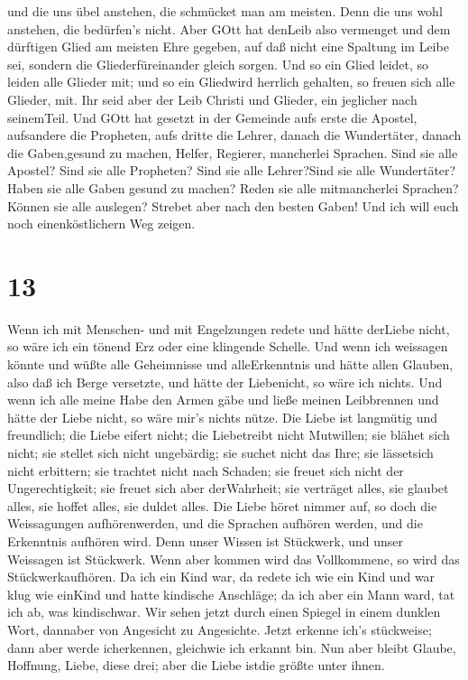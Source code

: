 und die uns übel anstehen, die schmücket man am meisten. 
Denn die uns wohl anstehen, die bedürfen's nicht. Aber GOtt hat denLeib
also vermenget und dem dürftigen Glied am meisten Ehre gegeben,
 auf daß nicht eine Spaltung im Leibe sei, sondern die
Gliederfüreinander gleich sorgen.  Und so ein Glied leidet,
so leiden alle Glieder mit; und so ein Gliedwird herrlich gehalten, so
freuen sich alle Glieder, mit.  Ihr seid aber der Leib
Christi und Glieder, ein jeglicher nach seinemTeil.  Und
GOtt hat gesetzt in der Gemeinde aufs erste die Apostel, aufsandere die
Propheten, aufs dritte die Lehrer, danach die Wundertäter, danach die
Gaben,gesund zu machen, Helfer, Regierer, mancherlei Sprachen.
 Sind sie alle Apostel? Sind sie alle Propheten? Sind sie
alle Lehrer?Sind sie alle Wundertäter?  Haben sie alle
Gaben gesund zu machen? Reden sie alle mitmancherlei Sprachen? Können
sie alle auslegen?  Strebet aber nach den besten Gaben! Und
ich will euch noch einenköstlichern Weg zeigen.

\hypertarget{section-12}{%
\section{13}\label{section-12}}

 Wenn ich mit Menschen- und mit Engelzungen redete und hätte
derLiebe nicht, so wäre ich ein tönend Erz oder eine klingende Schelle.
 Und wenn ich weissagen könnte und wüßte alle Geheimnisse
und alleErkenntnis und hätte allen Glauben, also daß ich Berge
versetzte, und hätte der Liebenicht, so wäre ich nichts. 
Und wenn ich alle meine Habe den Armen gäbe und ließe meinen Leibbrennen
und hätte der Liebe nicht, so wäre mir's nichts nütze.  Die
Liebe ist langmütig und freundlich; die Liebe eifert nicht; die
Liebetreibt nicht Mutwillen; sie blähet sich nicht;  sie
stellet sich nicht ungebärdig; sie suchet nicht das Ihre; sie lässetsich
nicht erbittern; sie trachtet nicht nach Schaden;  sie
freuet sich nicht der Ungerechtigkeit; sie freuet sich aber derWahrheit;
 sie verträget alles, sie glaubet alles, sie hoffet alles,
sie duldet alles.  Die Liebe höret nimmer auf, so doch die
Weissagungen aufhörenwerden, und die Sprachen aufhören werden, und die
Erkenntnis aufhören wird.  Denn unser Wissen ist Stückwerk,
und unser Weissagen ist Stückwerk.  Wenn aber kommen wird
das Vollkommene, so wird das Stückwerkaufhören.  Da ich ein
Kind war, da redete ich wie ein Kind und war klug wie einKind und hatte
kindische Anschläge; da ich aber ein Mann ward, tat ich ab, was
kindischwar.  Wir sehen jetzt durch einen Spiegel in einem
dunklen Wort, dannaber von Angesicht zu Angesichte. Jetzt erkenne ich's
stückweise; dann aber werde icherkennen, gleichwie ich erkannt bin.
 Nun aber bleibt Glaube, Hoffnung, Liebe, diese drei; aber
die Liebe istdie größte unter ihnen.


